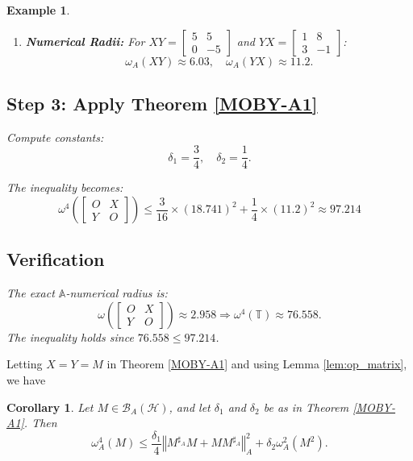 \documentclass{article}
\newcommand{\normA}[1]{{\left\Vert#1\right\Vert}_{A}}
\newcommand {\Ma}{M^{\sharp_{A}}}
\newcommand {\T}{\mathbb{T}}
\newcommand {\h}{\mathcal{H}}
\renewcommand {\b}{\mathcal{B}}
\newtheorem{corollary}[theorem]{Corollary}
\newtheorem{example}[theorem]{Example}
\begin{document}
\begin{example}
\begin{enumerate}
    \item \textbf{Numerical Radii:}
    For $XY = \begin{bmatrix} 5 & 5 \\ 0 & -5 \end{bmatrix}$ and $YX = \begin{bmatrix} 1 & 8 \\ 3 & -1 \end{bmatrix}$:
    \[
    \omega_A(XY) \approx 6.03, \quad \omega_A(YX) \approx 11.2.
    \]
\end{enumerate}
\subsection*{Step 3: Apply Theorem \ref{MOBY-A1}}
Compute constants:
\[
\delta_1 = \frac{3}{4}, \quad \delta_2 = \frac{1}{4}.
\]

The inequality becomes:
\[
\omega^4\left(\begin{bmatrix} O & X \\ Y & O \end{bmatrix}\right) \leq  \frac{3}{16}\times (18.741)^2+\frac{1}{4}\times (11.2)^2
\approx 97.214
\]

\subsection*{Verification}
The exact $\mathbb{A}$-numerical radius is:
\[
\omega\left(\begin{bmatrix} O & X \\ Y & O \end{bmatrix}\right) \approx 2.958 \Rightarrow \omega^4(\T) \approx 76.558.
\]
The inequality holds since $76.558 \leq 97.214$.
\end{example}
Letting $X=Y=M$ in Theorem \ref{MOBY-A1} and using Lemma \ref{lem:op_matrix}, we have
\begin{corollary}\label{MOBY-A2} Let $M\in\b_A(\h)$, and let $\delta_1$ and $\delta_2$ be as in Theorem \ref{MOBY-A1}. Then
\begin{equation}\label{omega4}
 \omega_A^4(M)\leq \frac{\delta_1}{4}\normA{\Ma M+M\Ma}^2+\delta_2\omega_A^2(M^2).
\end{equation}
\end{corollary}
\end{document}
